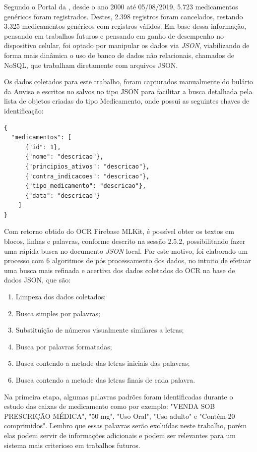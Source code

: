 Segundo o Portal da , desde o ano 2000 até 05/08/2019, 5.723 medicamentos genéricos foram registrados. Destes, 2.398 registros foram cancelados, restando 3.325 medicamentos genéricos com registros válidos. Em base dessa informação, pensando em trabalhos futuros e pensando em ganho de desempenho no dispositivo celular, foi optado por manipular os dados via \textit{JSON}, viabilizando de forma mais dinâmica o uso de banco de dados não relacionais, chamados de NoSQL, que trabalham diretamente com arquivos JSON.

Os dados coletados para este trabalho, foram capturados manualmente do bulário da Anvisa e escritos no salvos no tipo JSON para facilitar a busca detalhada pela lista de objetos criadas do tipo Medicamento, onde possui as seguintes chaves de identificação:

\begin{lstlisting}[firstnumber=1]
{
  "medicamentos": [
      {"id": 1},
      {"nome": "descricao"},
      {"principios_ativos": "descricao"},
      {"contra_indicacoes": "descricao"},
      {"tipo_medicamento": "descricao"},
      {"data": "descricao"}
    ]
}
\end{lstlisting}


Com retorno obtido do OCR Firebase MLKit, é possível obter os textos em blocos, linhas e palavras, conforme descrito na sessão 2.5.2, possibilitando fazer uma rápida busca no documento \textit{JSON} local. Por este motivo, foi elaborado um processo com 6 algoritmos de pós processamento dos dados, no intuito de efetuar uma busca mais refinada e acertiva dos dados coletados do OCR na base de dados JSON, que são:

\begin{enumerate}
  \item Limpeza dos dados coletados;
  \item Busca simples por palavras;
  \item Substituição de números visualmente similares a letras;
  \item Busca por palavras formatadas;
  \item Busca contendo a metade das letras iniciais das palavras;
  \item Busca contendo a metade das letras finais de cada palavra.
\end{enumerate}

Na primeira etapa, algumas palavras padrões foram identificadas durante o estudo das caixas de medicamento como por exemplo: "VENDA SOB PRESCRIÇÃO MÉDICA", "50 mg", "Uso Oral", "Uso adulto" e "Contém 20 comprimidos". Lembro que essas palavras serão excluídas neste trabalho, porém elas podem servir de informações adicionais e podem ser relevantes para um sistema mais criterioso em trabalhos futuros.

